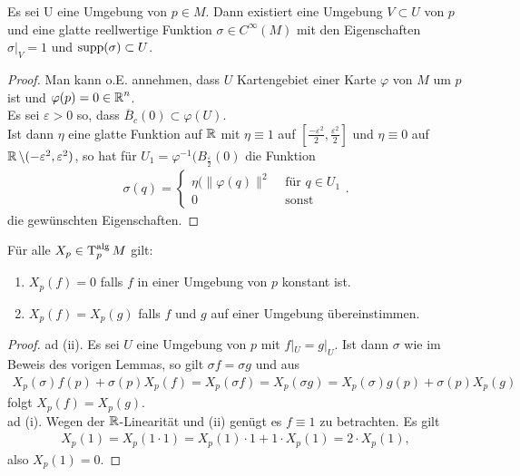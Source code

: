 \begin{lemma}
  Es sei U eine Umgebung von $p \in M$. Dann existiert eine Umgebung $V \subset U$ von $p$ und eine glatte reellwertige Funktion $\sigma \in C^{\infty}(M)$ mit den Eigenschaften $\sigma|_V = 1$ und $\operatorname{supp}(\sigma) \subset U$.
\end{lemma}



\begin{proof}
  Man kann o.E. annehmen, dass $U$ Kartengebiet einer Karte $\varphi$ von $M$ um $p$ ist und $\varphi(p) = 0 \in \operatorname{\mathbb{R}}^n$.\\

  Es sei $\varepsilon > 0$ so, dass $\overline B_c(0) \subset \varphi(U)$. \\


  Ist dann $\eta$ eine glatte Funktion auf $\operatorname{\mathbb{R}}$ mit $\eta \equiv 1$ auf $\left[\frac{-\varepsilon^{2}}{2},\frac{\varepsilon^2}{2}\right]$ und $\eta \equiv 0$ auf $\operatorname{\mathbb{R}} \setminus (-\varepsilon^2,\varepsilon^2)$, so hat für $U_1 = \varphi^{-1}(B_{\frac{\varepsilon}{2}}(0)$ die Funktion
  \begin{align*}
    \sigma(q) =
    \begin{cases}
      \eta(\|\varphi(q)\|^2 & \text{ für } q \in U_1\\
      0 & \text{ sonst }
    \end{cases}.
  \end{align*}
  die gewünschten Eigenschaften.
\end{proof}

\begin{lemma}
  Für alle $X_p\in\operatorname{T}_p^{\text{alg}}M$ gilt:
  \begin{enumerate}
  \item $X_p(f) = 0$ falls $f$ in einer Umgebung von $p$ konstant ist.
  \item $X_p(f) = X_p(g)$ falls $f$ und $g$ auf einer Umgebung übereinstimmen.
  \end{enumerate}
\end{lemma}

\begin{proof}
  ad (ii). Es sei $U$ eine Umgebung von $p$ mit $f|_U = g|_U$. Ist dann $\sigma$ wie im Beweis des vorigen Lemmas, so gilt $\sigma f = \sigma g$ und aus
  \begin{align*}
    X_p(\sigma)f(p)+\sigma(p)X_p(f) = X_{p}(\sigma f) = X_p(\sigma g) = X_p(\sigma) g(p) + \sigma(p) X_p(g)
  \end{align*}
  folgt $X_p(f) = X_p(g)$.\\
  ad (i). Wegen der $\operatorname{\mathbb{R}}$-Linearität und (ii) genügt es $f \equiv 1$ zu betrachten. Es gilt
  \begin{align*}
    X_p(1) = X_p(1 \cdot 1) = X_p(1) \cdot 1 + 1 \cdot X_p(1) = 2 \cdot X_p(1),
  \end{align*}
  also $X_p(1) = 0$.
\end{proof}

